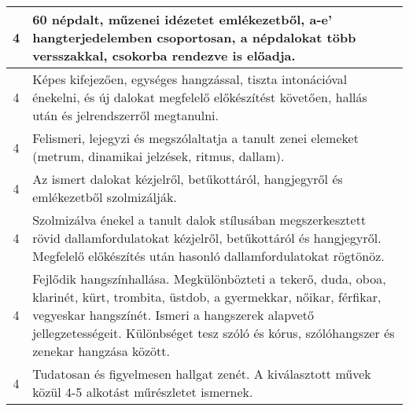 \begin{longtable}{c | p{} }
                                
                                          4 &  60 népdalt, műzenei idézetet emlékezetből, a-e’ hangterjedelemben csoportosan, a népdalokat több versszakkal, csokorba rendezve is előadja. \\ \hline
                                          4 &  Képes kifejezően, egységes hangzással, tiszta intonációval énekelni, és új dalokat megfelelő előkészítést követően, hallás után és jelrendszerről megtanulni. \\ \hline
                                          4 &  Felismeri, lejegyzi és megszólaltatja a tanult zenei elemeket (metrum, dinamikai jelzések, ritmus, dallam). \\ \hline
                                          4 &  Az ismert dalokat kézjelről, betűkottáról, hangjegyről és emlékezetből szolmizálják. \\ \hline
                                          4 &  Szolmizálva énekel a tanult dalok stílusában megszerkesztett rövid dallamfordulatokat kézjelről, betűkottáról és hangjegyről. Megfelelő előkészítés után hasonló dallamfordulatokat rögtönöz. \\ \hline
                                          4 &  Fejlődik hangszínhallása. Megkülönbözteti a tekerő, duda, oboa, klarinét, kürt, trombita, üstdob, a gyermekkar, nőikar, férfikar, vegyeskar hangszínét. Ismeri a hangszerek alapvető jellegzetességeit. Különbséget tesz szóló és kórus, szólóhangszer és zenekar hangzása között. \\ \hline
                                          4 &  Tudatosan és figyelmesen hallgat zenét. A kiválasztott művek közül 4-5 alkotást műrészletet ismernek. \\ \hline
                                      
                        \end{longtable}
            \clearpage

